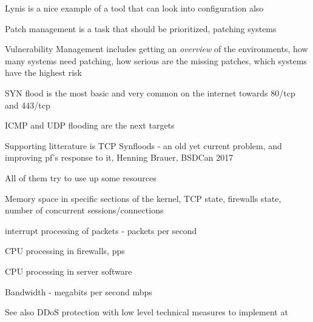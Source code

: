 \documentclass[Screen16to9,17pt]{foils}
\begin{document}
\begin{list2}
\item Lynis is a nice example of a tool that can look into configuration also
\item Patch management is a task that should be prioritized, patching systems
\item Vulnerability Management includes getting an \emph{overview} of the environments, how many systems need patching, how serious are the missing patches, which systems have the highest risk
\end{list2}




\begin{list2}
\item SYN flood is the most basic and very common on the internet towards 80/tcp and 443/tcp
\item ICMP and UDP flooding are the next targets
\item Supporting litterature is TCP Synfloods - an old yet current problem, and improving pf's response to it, Henning Brauer, BSDCan 2017
\item All of them try to use up some resources
\begin{list2}
\item Memory space in specific sections of the kernel, TCP state, firewalls state, number of concurrent sessions/connections
\item interrupt processing of packets - packets per second
\item CPU processing in firewalls, pps
\item CPU processing in server software
\item Bandwidth - megabits per second mbps
\end{list2}
\end{list2}

See also DDoS protection with low level technical measures to implement at\\
{\footnotesize {}}




\end{document}
